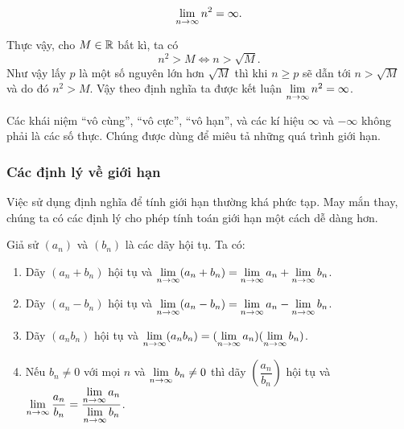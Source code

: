 \begin{example}
	$$ \lim\limits_{n \to \infty} n^2 = \infty. $$
	\begin{solution}
		Thực vậy, cho $M \in \mathbb{R}$ bất kì, ta có
		$$ n^2 > M \iff n > \sqrt{M}. $$
		Như vậy lấy $p$ là một số nguyên lớn hơn $\sqrt{M}$ thì khi $n \ge p$ sẽ dẫn tới $n > \sqrt{M}$ và do đó $n^2 > M$. Vậy theo định nghĩa ta được kết luận $\lim\limits_{n \to \infty} n^2 = \infty$.
	\end{solution}
\end{example}

\begin{mynote}[label={note:infinity-concepts}]
	Các khái niệm ``vô cùng'', ``vô cực'', ``vô hạn'', và các kí hiệu $\infty$ và $-\infty$ không phải là các số thực. Chúng được dùng để miêu tả những quá trình giới hạn.
\end{mynote}

\subsubsection{Các định lý về giới hạn}

Việc sử dụng định nghĩa để tính giới hạn thường khá phức tạp. May mắn thay, chúng ta có các định lý cho phép tính toán giới hạn một cách dễ dàng hơn.

\begin{theorem}
    \label{thm:limit-preserve-operations}
    Giả sử $(a_n)$ và $(b_n)$ là các dãy hội tụ. Ta có:
    \begin{enumerate}[label=(\alph*)]
        \item Dãy $(a_n + b_n)$ hội tụ và $\lim\limits_{n \to \infty}(a_n + b_n) = \lim\limits_{n \to \infty}a_n + \lim\limits_{n \to \infty}b_n$.
        
        \item Dãy $(a_n - b_n)$ hội tụ và $\lim\limits_{n \to \infty}(a_n - b_n) = \lim\limits_{n \to \infty}a_n - \lim\limits_{n \to \infty}b_n$.
        
        \item Dãy $(a_n b_n)$ hội tụ và $\lim\limits_{n \to \infty}(a_n b_n) = (\lim\limits_{n \to \infty}a_n)(\lim\limits_{n \to \infty}b_n)$.
        
        \item Nếu $b_n \neq 0$ với mọi $n$ và $\lim\limits_{n \to \infty}b_n \neq 0$ thì dãy $(\dfrac{a_n}{b_n})$ hội tụ và $\lim\limits_{n \to \infty}\dfrac{a_n}{b_n} = \dfrac{\lim\limits_{n \to \infty}a_n}{\lim\limits_{n \to \infty}b_n}$.
    \end{enumerate}
\end{theorem}

